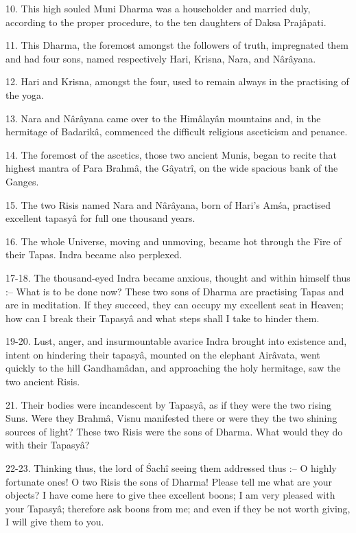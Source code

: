 10. This high souled Muni Dharma was a householder and married duly, according to the proper procedure, to the ten daughters of Daksa Praj\^apati.

11. This Dharma, the foremost amongst the followers of truth, impregnated them and had four sons, named respectively Hari, Krisna, Nara, and N\^ar\^ayana.

12. Hari and Krisna, amongst the four, used to remain always in the practising of the yoga.

13. Nara and N\^ar\^ayana came over to the Him\^alay\^an mountains and, in the hermitage of Badarik\^a, commenced the difficult religious asceticism and penance.

14. The foremost of the ascetics, those two ancient Munis, began to recite that highest mantra of Para Brahm\^a, the G\^ayatr\^i, on the wide spacious bank of the Ganges.

15. The two Risis named Nara and N\^ar\^ayana, born of Hari's Am\'sa, practised excellent tapasy\^a for full one thousand years.

16. The whole Universe, moving and unmoving, became hot through the Fire of their Tapas. Indra became also perplexed.

17-18. The thousand-eyed Indra became anxious, thought and within himself thus :-- What is to be done now? These two sons of Dharma are practising Tapas and are in meditation. If they succeed, they can occupy my excellent seat in Heaven; how can I break their Tapasy\^a and what steps shall I take to hinder them.

19-20. Lust, anger, and insurmountable avarice Indra brought into existence and, intent on hindering their tapasy\^a, mounted on the elephant Air\^avata, went quickly to the hill Gandham\^adan, and approaching the holy hermitage, saw the two ancient Risis.

21. Their bodies were incandescent by Tapasy\^a, as if they were the two rising Suns. Were they Brahm\^a, Visnu manifested there or were they the two shining sources of light? These two Risis were the sons of Dharma. What would they do with their Tapasy\^a?

22-23. Thinking thus, the lord of \'Sach\^i seeing them addressed thus :-- O highly fortunate ones! O two Risis the sons of Dharma! Please tell me what are your objects? I have come here to give thee excellent boons; I am very pleased with your Tapasy\^a; therefore ask boons from me; and even if they be not worth giving, I will give them to you.

